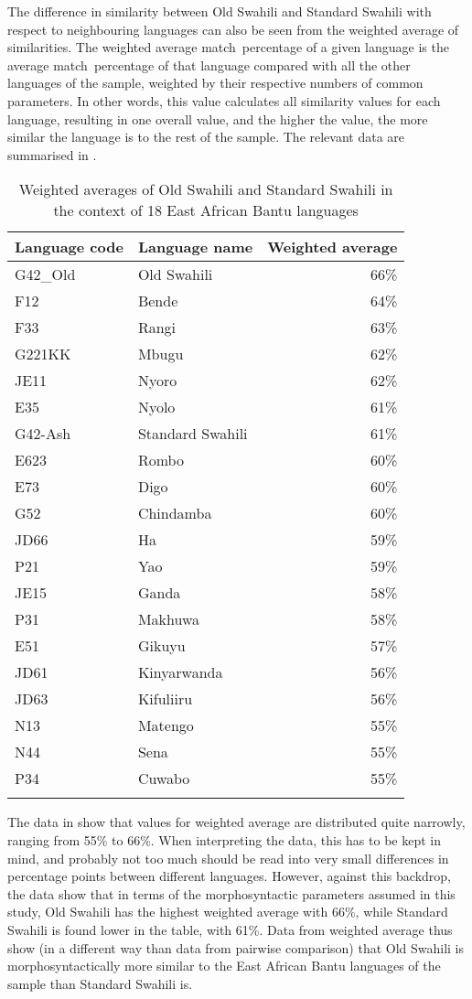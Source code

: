 \documentclass[output=paper]{langscibook}
\begin{document}
The difference in similarity between Old Swahili and Standard Swahili with respect to neighbouring languages can also be seen from the weighted average of similarities. The weighted average match~percentage of a given language is the average match~percentage of that language compared with all the other languages of the sample, weighted by their respective numbers of common parameters. In other words, this value calculates all similarity values for each language, resulting in one overall value, and the higher the value, the more similar the language is to the rest of the sample. The relevant data are summarised in .

\begin{table}
\begin{tabular}{llr}

\lsptoprule

{Language code} &  Language name & {Weighted average}\\
\midrule
G42\_Old & Old Swahili & 66\%\\
F12 & Bende & 64\%\\
F33 & Rangi & 63\%\\
G221KK & Mbugu & 62\%\\
JE11 & Nyoro & 62\%\\
E35 & Nyolo & 61\%\\
G42-Ash & Standard Swahili & 61\%\\
E623 & Rombo & 60\%\\
E73 & Digo & 60\%\\
G52 & Chindamba & 60\%\\
JD66 & Ha & 59\%\\
P21 & Yao & 59\%\\
JE15 & Ganda & 58\%\\
P31 & Makhuwa & 58\%\\
E51 & Gikuyu & 57\%\\
JD61 & Kinyarwanda & 56\%\\
JD63 & Kifuliiru & 56\%\\
N13 & Matengo & 55\%\\
N44 & Sena & 55\%\\
P34 & Cuwabo & 55\%\\
\lspbottomrule
\end{tabular}
\caption{\label{tab:marten:9} Weighted averages of Old Swahili and Standard Swahili in the context of 18 East African Bantu languages}
\end{table}

The data in  show that values for weighted average are distributed quite narrowly, ranging from 55\% to 66\%. When interpreting the data, this has to be kept in mind, and probably not too much should be read into very small differences in percentage points between different languages. However, against this backdrop, the data show that in terms of the morphosyntactic parameters assumed in this study, Old Swahili has the highest weighted average with 66\%, while Standard Swahili is found lower in the table, with 61\%. Data from weighted average thus show (in a different way than data from pairwise comparison) that Old Swahili is morphosyntactically more similar to the East African Bantu languages of the sample than Standard Swahili is. 
\end{document}
